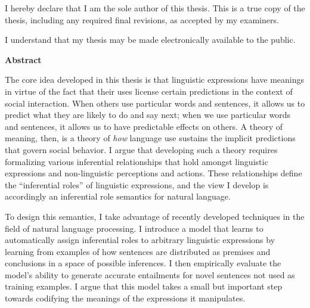 \cleardoublepage %
 


  \noindent
I hereby declare that I am the sole author of this thesis. This is a true copy of the thesis, including any required final revisions, as accepted by my examiners.

  \bigskip
  
  \noindent
I understand that my thesis may be made electronically available to the public.

\cleardoublepage


\begin{center}\textbf{Abstract}\end{center}

The core idea developed in this thesis is that linguistic expressions have meanings in virtue of the fact that their uses license certain predictions in the context of social interaction. When others use particular words and sentences, it allows us to predict what they are likely to do and say next; when we use particular words and sentences, it allows us to have predictable effects on others. A theory of meaning, then, is a theory of \textit{how} language use sustains the implicit predictions that govern social behavior. I argue that developing such a theory requires formalizing various inferential relationships that hold amongst linguistic expressions and non-linguistic perceptions and actions. These relationships define the ``inferential roles'' of linguistic expressions, and the view I develop is accordingly an inferential role semantics for natural language.
 
To design this semantics, I take advantage of recently developed techniques in the field of natural language processing. I introduce a model that learns to automatically assign inferential roles to arbitrary linguistic expressions by learning from examples of how sentences are distributed as premises and conclusions in a space of possible inferences. I then empirically evaluate the model's ability to generate accurate entailments for novel sentences not used as training examples. I argue that this model takes a small but important step towards codifying the meanings of the expressions it manipulates.

